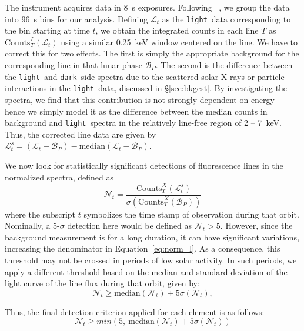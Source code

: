 \documentclass[twocolumn]{aastex631}
\newcommand{\dark}{\texttt{dark}~}
\newcommand{\light}{\texttt{light}~}
\begin{document}
The instrument acquires data in 8~s exposures. Following ~\citet{NARENDRANATH2024115898}, we group the data into 96~s bins for our analysis. Defining $\mathcal{L}_t$ as the \light data corresponding to the bin starting at time $t$, we obtain the integrated counts in each line $T$ as $\text{Counts}^L_T\left(\mathcal{L}_t\right)$ using a similar 0.25~keV window centered on the line. We have to correct this for two effects. The first is simply the appropriate background for the corresponding line in that lunar phase $\mathcal{B}_P$. The second is the difference between the \light and \dark side spectra due to the scattered solar X-rays or particle interactions in the \light data, discussed in \S\ref{sec:bkgest}. By investigating the spectra, we find that this contribution is not strongly dependent on energy --- hence we simply model it as the difference between the median counts in background and \light spectra in the relatively line-free region of 2 -- 7~keV. Thus, the corrected line data are given by $\mathcal{L}^s_t = \left(\mathcal{L}_t - \mathcal{B}_P\right) - \mathrm{median}\left(\mathcal{L}_t - \mathcal{B}_P\right)$. 

We now look for statistically significant detections of fluorescence lines in the normalized spectra, defined as
\begin{equation}
    \mathcal{N}_t = \frac{\text{Counts}^X_T(\mathcal L^s_t)}{\sigma\left(\text{Counts}_T^X\left(\mathcal{B}_P\right)\right)} \label{eq:norm_l}
\end{equation}
where the subscript $t$ symbolizes the time stamp of observation during that orbit.
Nominally, a 5-$\sigma$ detection here would be defined as $\mathcal{N}_t > 5$. However, since the background measurement is for a long duration, it can have significant variations, increasing the denominator in Equation~\ref{eq:norm_l}. As a consequence, this threshold may not be crossed in periods of low solar activity. In such periods, we apply a different threshold based on the median and standard deviation of the light curve of the line flux during that orbit, given by:
\begin{equation}
   \mathcal{N}_t \geq \text{median}(\mathcal{N}_t) + 5 \sigma(\mathcal{N}_t),
    \label{eq:detection-criteria1}
\end{equation}

Thus, the final detection criterion applied for each element is as follows:
\begin{equation}
   \mathcal{N}_t \geq min \left(5,~\text{median}(\mathcal{N}_t) + 5 \sigma(\mathcal{N}_t) \right)
    \label{eq:detection-criteria}
\end{equation}
\end{document}
